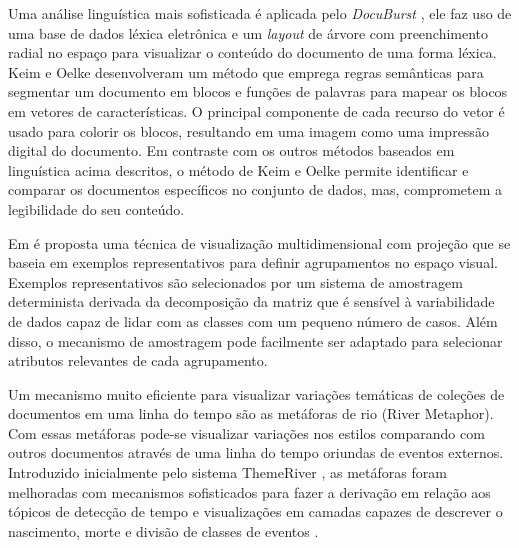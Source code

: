 Uma análise linguística mais sofisticada é aplicada pelo \textit{DocuBurst} \cite{collins2009docuburst}, ele faz uso de uma base de dados léxica eletrônica e um \textit{layout} de árvore com preenchimento radial no espaço para visualizar o conteúdo do documento de uma forma léxica. Keim e Oelke \cite{keim2007literature} desenvolveram um método que emprega regras semânticas para segmentar um documento em blocos e funções de palavras para mapear os blocos em vetores de características. O principal componente de cada recurso do vetor é usado para colorir os blocos, resultando em uma imagem como uma impressão digital do documento. Em contraste com os outros métodos  baseados em linguística acima descritos, o método de Keim e Oelke \cite{keim2007literature} permite identificar e comparar os documentos específicos no conjunto de dados, mas, comprometem a legibilidade do seu conteúdo.


Em \cite{joia2015uncovering} é proposta uma técnica de visualização multidimensional com projeção que se baseia em exemplos representativos para definir agrupamentos no espaço visual. Exemplos representativos são selecionados por um sistema de amostragem determinista derivada da decomposição da matriz que é sensível à variabilidade de dados capaz de lidar com as classes com um pequeno número de casos. Além disso, o mecanismo de amostragem pode facilmente ser adaptado para selecionar atributos relevantes de cada agrupamento.

Um mecanismo muito eficiente para visualizar variações temáticas de coleções de documentos em uma linha do tempo são as metáforas de rio (River Metaphor). Com essas metáforas pode-se visualizar variações nos estilos comparando com outros documentos através de uma linha do tempo oriundas de eventos externos. Introduzido inicialmente pelo sistema ThemeRiver \cite{havre2002themeriver}, as metáforas foram melhoradas com mecanismos sofisticados para fazer a derivação em relação aos tópicos de detecção de tempo \cite{liu2012tiara} e visualizações em camadas capazes de descrever o nascimento, morte e divisão de classes de eventos \cite{cui2011textflow}. 

